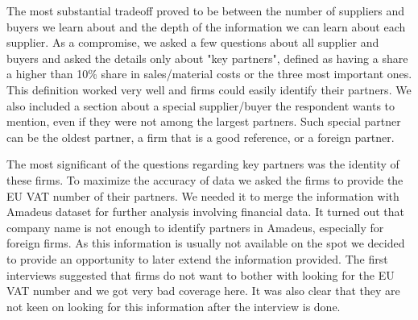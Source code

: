 \documentclass[final, dvipsnames, authoryear,12pt]{elsarticle}
\begin{document}


The most substantial tradeoff proved to be between the number of suppliers and buyers we learn about and the depth of the information we can learn about each supplier. As a compromise, we asked a few questions about all supplier and buyers and asked the details only about "key partners", defined as having a share a higher than 10\% share in sales/material costs or the three most important ones. This definition worked very well and firms could easily identify their partners. We also included a section about a special supplier/buyer the respondent wants to mention, even if they were not among the largest partners. Such special partner can be the oldest partner, a firm that is a good reference, or a foreign partner.

The most significant of the questions regarding key partners was the identity of these firms. To maximize the accuracy of data we asked the firms to provide the EU VAT number of their partners. We needed it to merge the information with Amadeus dataset for further analysis involving financial data. It turned out that company name is not enough to identify partners in Amadeus, especially for foreign firms. As this information is usually not available on the spot we decided to provide an opportunity to later extend the information provided. The first interviews suggested that firms do not want to bother with looking for the EU VAT number and we got very bad coverage here. It was also clear that they are not keen on looking for this information after the interview is done.
\end{document}
